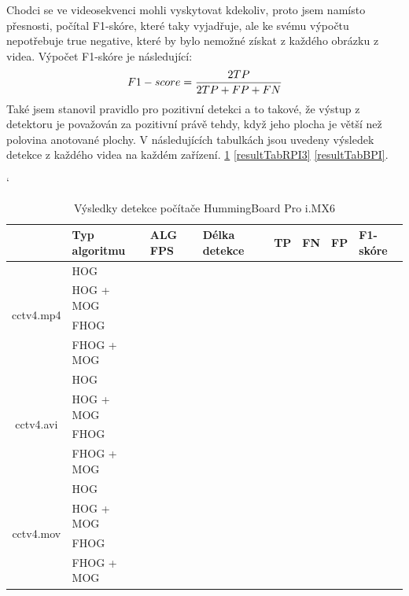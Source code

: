 Chodci se ve videosekvenci mohli vyskytovat kdekoliv, proto jsem namísto přesnosti, počítal F1-skóre, které taky vyjadřuje, ale ke svému výpočtu nepotřebuje true negative, které by bylo nemožné získat z každého obrázku z videa. Výpočet F1-skóre je následující:
\begin{equation*}
\centering
 \label{eq:f1score}
 \begin{aligned}
F1-score = \frac{ 2TP}{2TP + FP + FN}
 \end{aligned}
\end{equation*}
Také jsem stanovil pravidlo pro pozitivní detekci a to takové, že výstup z detektoru je považován za pozitivní právě tehdy, když jeho plocha je větší než polovina anotované plochy.
V následujících tabulkách jsou uvedeny výsledek detekce z každého videa na každém zařízení. \ref{resultTabIMX} \ref{resultTabRPI3} \ref{resultTabBPI}.
\begin{table}[H]
\catcode`
\centering
\caption{Výsledky detekce počítače HummingBoard Pro i.MX6 }
\label{resultTabIMX}
\begin{tabular}{|c|l|l|l|l|l|l|l|}
\hline
                         & Typ algoritmu   	& ALG FPS & Délka detekce & TP & FN & FP & F1-skóre \\ \hline
\multirow{4}{*}{cctv4.mp4} & HOG        	&         &               &    &    &    &          \\ \cline{2-8} 
                         & HOG + MOG  		&         &               &    &    &    &          \\ \cline{2-8} 
                         & FHOG       		&         &               &    &    &    &          \\ \cline{2-8} 
                         & FHOG + MOG 		&         &               &    &    &    &          \\ \hline\hline 
\multirow{4}{*}{cctv4.avi} & HOG        	&         &               &    &    &    &          \\ \cline{2-8} 
                         & HOG + MOG  		&         &               &    &    &    &          \\ \cline{2-8} 
                         & FHOG       		&         &               &    &    &    &          \\ \cline{2-8} 
                         & FHOG + MOG 		&         &               &    &    &    &          \\ \hline \hline
\multirow{4}{*}{cctv4.mov} & HOG        	&         &               &    &    &    &          \\ \cline{2-8} 
                         & HOG + MOG  		&         &               &    &    &    &          \\ \cline{2-8} 
                         & FHOG       		&         &               &    &    &    &          \\ \cline{2-8} 
                         & FHOG + MOG 		&         &               &    &    &    &          \\ \hline
\end{tabular}
\end{table}


